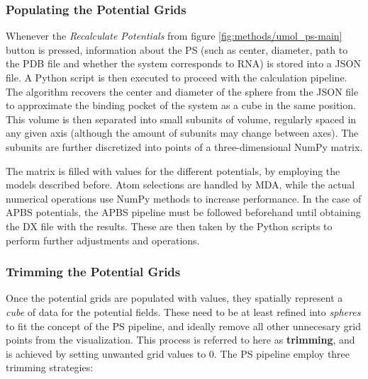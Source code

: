     \subsubsection{Populating the Potential Grids}
      Whenever the \textit{Recalculate Potentials} from figure \ref{fig:methods/umol_ps-main} button is pressed, information about the PS (such as center, diameter, path to the PDB file and whether the system corresponds to RNA) is stored into a JSON file. A Python script is then executed to proceed with the calculation pipeline. The algorithm recovers the center and diameter of the sphere from the JSON file to approximate the binding pocket of the system as a cube in the same position. This volume is then separated into small subunits of volume, regularly spaced in any given axis (although the amount of subunits may change between axes). The subunits are further discretized into points of a three-dimensional NumPy matrix.

      The matrix is filled with values for the different potentials, by employing the models described before. Atom selections are handled by MDA, while the actual numerical operations use NumPy methods to increase performance. In the case of APBS potentials, the APBS pipeline must be followed beforehand until obtaining the DX file with the results. These are then taken by the Python scripts to perform further adjustments and operations.

    \subsubsection{Trimming the Potential Grids}
      Once the potential grids are populated with values, they spatially represent a \textit{cube} of data for the potential fields. These need to be at least refined into \textit{spheres} to fit the concept of the PS pipeline, and ideally remove all other unnecesary grid points from the visualization. This process is referred to here as \textbf{trimming}, and is achieved by setting unwanted grid values to $0$. The PS pipeline employ three trimming strategies:

